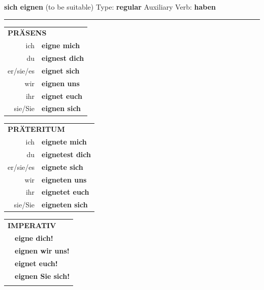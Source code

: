 \documentclass[10pt,a4paper]{revtex4-2}
\begin{document}
\begin{verbbox}
    {\Large \bf sich eignen} (to be suitable) \hfill Type: \textbf{regular} \hfill Auxiliary Verb: \textbf{haben} 
    
     \vspace{5pt}

    \hrule
    
    \vspace{5pt}

  \begin{tabular}{rl}
     \multicolumn{2}{l}{\textbf{PRÄSENS} }\\
    ich & \textbf{eigne mich}\\
    du & \textbf{eignest dich}\\
    er/sie/es & \textbf{eignet sich}\\
    wir & \textbf{eignen uns}\\
    ihr & \textbf{eignet euch}\\
    sie/Sie & \textbf{eignen sich}\\
  \end{tabular}
  \hfill
     \begin{tabular}{rl}
    \multicolumn{2}{l}{\textbf{PRÄTERITUM} }\\
    ich & \textbf{eignete mich}\\
    du & \textbf{eignetest dich}\\
    er/sie/es & \textbf{eignete sich}\\
    wir & \textbf{eigneten uns}\\
    ihr & \textbf{eignetet euch}\\
    sie/Sie & \textbf{eigneten sich}\\
  \end{tabular}
  \hfill
  \begin{tabular}{rl}
     \multicolumn{2}{l}{\textbf{IMPERATIV} }\\
   & \textbf{eigne dich!}\\
   & \textbf{eignen wir uns!}\\
   & \textbf{eignet euch!}\\
   & \textbf{eignen Sie sich!}\\
   & \vspace{10pt}
  \end{tabular}

    \vspace{10pt}


\end{verbbox}
\end{document}
